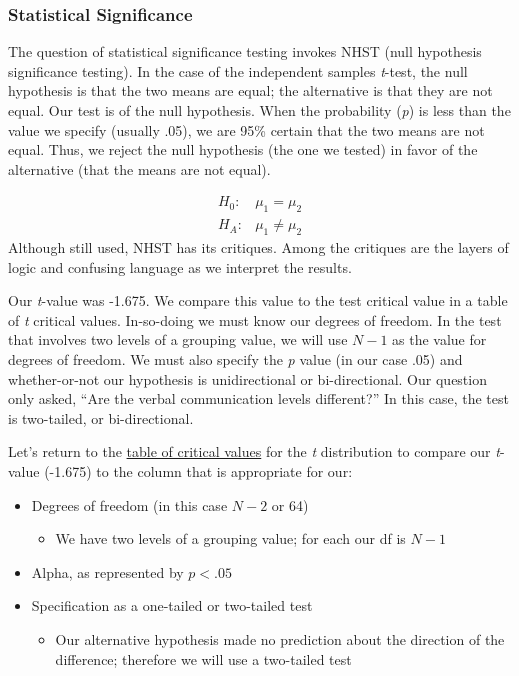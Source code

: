 \documentclass[
  11pt,
]{book}
\providecommand{\tightlist}{%
  \setlength{\itemsep}{0pt}\setlength{\parskip}{0pt}}
\begin{document}
\hypertarget{statistical-significance-1}{%
\subsubsection{Statistical Significance}\label{statistical-significance-1}}

The question of statistical significance testing invokes NHST (null hypothesis significance testing). In the case of the independent samples \emph{t}-test, the null hypothesis is that the two means are equal; the alternative is that they are not equal. Our test is of the null hypothesis. When the probability (\emph{p}) is less than the value we specify (usually .05), we are 95\% certain that the two means are not equal. Thus, we reject the null hypothesis (the one we tested) in favor of the alternative (that the means are not equal).

\[
\begin{array}{ll}
H_0: & \mu_1 = \mu_2  \\
H_A: & \mu_1 \neq \mu_2
\end{array}
\]
Although still used, NHST has its critiques. Among the critiques are the layers of logic and confusing language as we interpret the results.

Our \emph{t}-value was -1.675. We compare this value to the test critical value in a table of \emph{t} critical values. In-so-doing we must know our degrees of freedom. In the test that involves two levels of a grouping value, we will use \(N -1\) as the value for degrees of freedom. We must also specify the \emph{p} value (in our case .05) and whether-or-not our hypothesis is unidirectional or bi-directional. Our question only asked, ``Are the verbal communication levels different?'' In this case, the test is two-tailed, or bi-directional.

Let's return to the \href{https://www.statology.org/t-distribution-table/}{table of critical values} for the \emph{t} distribution to compare our \emph{t}-value (-1.675) to the column that is appropriate for our:

\begin{itemize}
\tightlist
\item
  Degrees of freedom (in this case \(N-2\) or 64)

  \begin{itemize}
  \tightlist
  \item
    We have two levels of a grouping value; for each our df is \(N-1\)
  \end{itemize}
\item
  Alpha, as represented by \(p < .05\)
\item
  Specification as a one-tailed or two-tailed test

  \begin{itemize}
  \tightlist
  \item
    Our alternative hypothesis made no prediction about the direction of the difference; therefore we will use a two-tailed test
  \end{itemize}
\end{itemize}
\end{document}
